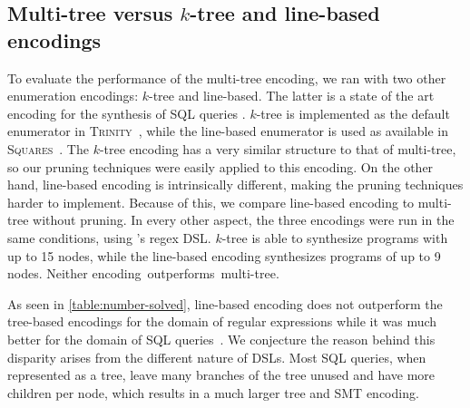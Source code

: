 \subsection{Multi-tree versus \(k\)-tree and line-based encodings}\label{sec:multi-tree-vs-encodings}
%

To evaluate the performance of the multi-tree encoding, we ran \Forest{} with two other enumeration encodings: \(k\)-tree and line-based.
The latter is a state of the art encoding for the synthesis of SQL queries \cite{Orvalho19}. \(k\)-tree is implemented as the default enumerator in \textsc{Trinity}~\cite{trinity19}, while the line-based enumerator is used as available in \textsc{Squares}~\cite{squares-webpage}. The \(k\)-tree encoding has a very similar structure to that of multi-tree, so our pruning techniques were easily applied to this encoding. On the other hand, line-based encoding is intrinsically different, making the pruning techniques harder to implement. Because of this, we compare line-based encoding to multi-tree without pruning.
In every other aspect, the three encodings were run in the same conditions, using \Forest{}'s regex \ac{DSL}.
\(k\)-tree is able to synthesize programs with up to 15 nodes, while the line-based encoding synthesizes programs of up to 9 nodes. Neither encoding~outperforms~multi-tree. %

As seen in \autoref{table:number-solved}, line-based encoding does not outperform the tree-based encodings for the domain of regular expressions while it was much better for the domain of SQL queries~\cite{Orvalho19}. We conjecture the reason behind this disparity arises from the different nature of DSLs. Most SQL queries, when represented as a tree, leave many branches of the tree unused and have more children per node, which results in a much larger tree and SMT encoding.


